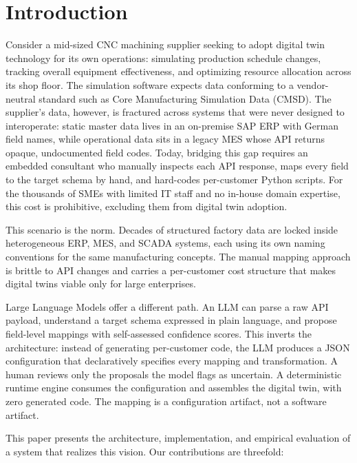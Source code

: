 \documentclass[3p,times,procedia]{elsarticle}
\begin{document}
\section{Introduction}
\label{sec:intro}

Consider a mid-sized CNC machining supplier seeking to adopt digital twin technology for its own operations: simulating production schedule changes, tracking overall equipment effectiveness, and optimizing resource allocation across its shop floor. The simulation software expects data conforming to a vendor-neutral standard such as Core Manufacturing Simulation Data (CMSD). The supplier's data, however, is fractured across systems that were never designed to interoperate: static master data lives in an on-premise SAP ERP with German field names, while operational data sits in a legacy MES whose API returns opaque, undocumented field codes. Today, bridging this gap requires an embedded consultant who manually inspects each API response, maps every field to the target schema by hand, and hard-codes per-customer Python scripts. For the thousands of SMEs with limited IT staff and no in-house domain expertise, this cost is prohibitive, excluding them from digital twin adoption.

This scenario is the norm. Decades of structured factory data are locked inside heterogeneous ERP, MES, and SCADA systems, each using its own naming conventions for the same manufacturing concepts. The manual mapping approach is brittle to API changes and carries a per-customer cost structure that makes digital twins viable only for large enterprises.

Large Language Models offer a different path. An LLM can parse a raw API payload, understand a target schema expressed in plain language, and propose field-level mappings with self-assessed confidence scores. This inverts the architecture: instead of generating per-customer code, the LLM produces a JSON configuration that declaratively specifies every mapping and transformation. A human reviews only the proposals the model flags as uncertain. A deterministic runtime engine consumes the configuration and assembles the digital twin, with zero generated code. The mapping is a configuration artifact, not a software artifact.

This paper presents the architecture, implementation, and empirical evaluation of a system that realizes this vision. Our contributions are threefold:
\end{document}
